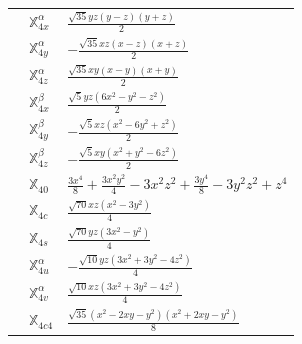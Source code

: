 \documentclass[fleqn,9pt,landscape]{jsarticle}
\begin{document}
\begin{longtable}{cll}
 & $\mathbb{X}_{4x}^{\alpha}$ & $\frac{\sqrt{35} y z \left(y - z\right) \left(y + z\right)}{2}$ \\
 & $\mathbb{X}_{4y}^{\alpha}$ & $- \frac{\sqrt{35} x z \left(x - z\right) \left(x + z\right)}{2}$ \\
 & $\mathbb{X}_{4z}^{\alpha}$ & $\frac{\sqrt{35} x y \left(x - y\right) \left(x + y\right)}{2}$ \\
 & $\mathbb{X}_{4x}^{\beta}$ & $\frac{\sqrt{5} y z \left(6 x^{2} - y^{2} - z^{2}\right)}{2}$ \\
 & $\mathbb{X}_{4y}^{\beta}$ & $- \frac{\sqrt{5} x z \left(x^{2} - 6 y^{2} + z^{2}\right)}{2}$ \\
 & $\mathbb{X}_{4z}^{\beta}$ & $- \frac{\sqrt{5} x y \left(x^{2} + y^{2} - 6 z^{2}\right)}{2}$ \\
 & $\mathbb{X}_{40}$ & $\frac{3 x^{4}}{8} + \frac{3 x^{2} y^{2}}{4} - 3 x^{2} z^{2} + \frac{3 y^{4}}{8} - 3 y^{2} z^{2} + z^{4}$ \\
 & $\mathbb{X}_{4c}$ & $\frac{\sqrt{70} x z \left(x^{2} - 3 y^{2}\right)}{4}$ \\
 & $\mathbb{X}_{4s}$ & $\frac{\sqrt{70} y z \left(3 x^{2} - y^{2}\right)}{4}$ \\
 & $\mathbb{X}_{4u}^{\alpha}$ & $- \frac{\sqrt{10} y z \left(3 x^{2} + 3 y^{2} - 4 z^{2}\right)}{4}$ \\
 & $\mathbb{X}_{4v}^{\alpha}$ & $\frac{\sqrt{10} x z \left(3 x^{2} + 3 y^{2} - 4 z^{2}\right)}{4}$ \\
 & $\mathbb{X}_{4c4}$ & $\frac{\sqrt{35} \left(x^{2} - 2 x y - y^{2}\right) \left(x^{2} + 2 x y - y^{2}\right)}{8}$ \\
\end{longtable}
\renewcommand{\arraystretch}{1.6}
\end{document}
